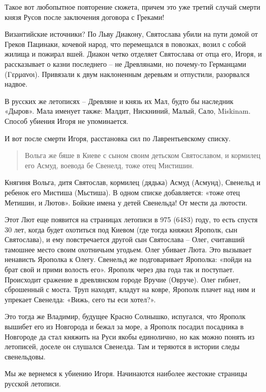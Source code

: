 Такое вот любопытное повторение сюжета, причем это уже третий случай смерти князя Русов после заключения договора с Греками!

Византийские источники? По Льву Диакону, Святослава убили на пути домой от Греков Пацинаки, кочевой народ, что перемещался в повозках, возил с собой жилища и пожирал вшей. Диакон четко отделяет Святослава от отца его, Игоря, и рассказывает о казни последнего – не Древлянами, но почему-то Германцами (Γερμανοι).  Привязали к двум наклоненным деревьям и отпустили, разорвался надвое.

В русских же летописях – Древляне и князь их Мал, будто бы наследник «Дыров». Мала именует также: Малдит, Нискниний, Малый, Сало, Miskinam. Способ убиения Игоря не упоминается.

И вот после смерти Игоря, расстановка сил по Лаврентьевскому списку.

\begin{quotation}
Вольга же бяше в Киеве с сыном своим детьском Святославом, и кормилец его Асмуд, воевода бе Свенелд, тоже отец Мистишин.
\end{quotation}

Княгиня Вольга, дитя Святослав, кормилец (дядька) Асмуд (Асмунд), Свенельд и ребенок его Мистиша (Мьстиша). В одном списке добавляется: «тоже отец Метишин, и Лютов». Бойкие имена у детей Свенельда! От мести да лютости.

Этот Лют еще появится на страницах летописи в 975 (6483) году, то есть спустя 30 лет, когда будет охотиться под Киевом (где тогда княжил Ярополк, сын Святослава), и ему повстречается другой сын Святослава – Олег, считавший тамошнее место своим охотничьим угодьем. Олег убивает Люта. Это вызывает ненависть Ярополка к Олегу. Свенельд же подговаривает Ярополка: «пойди на брат свой и прими волость его». Ярополк через два года так и поступает. Происходит сражение в древлянском городе Вручие (Овруче). Олег гибнет, сброшенный с моста. Труп находят, кладут на ковре, Ярополк плачет над ним и упрекает Свенелда: «Вижь, сего ты еси хотел?». 

Это тогда же Владимир, будущее Красно Солнышко, испугался, что Ярополк вышибет его из Новгорода и бежал за море, а Ярополк посадил посадника в Новгороде да стал княжить на Руси якобы единолично, но как можно понять из летописей, доселе он слушался Свенелда. Там и теряются в истории следы свенельдовы.

Мы же вернемся к убиению Игоря. Начинаются наиболее жестокие страницы русской летописи.

